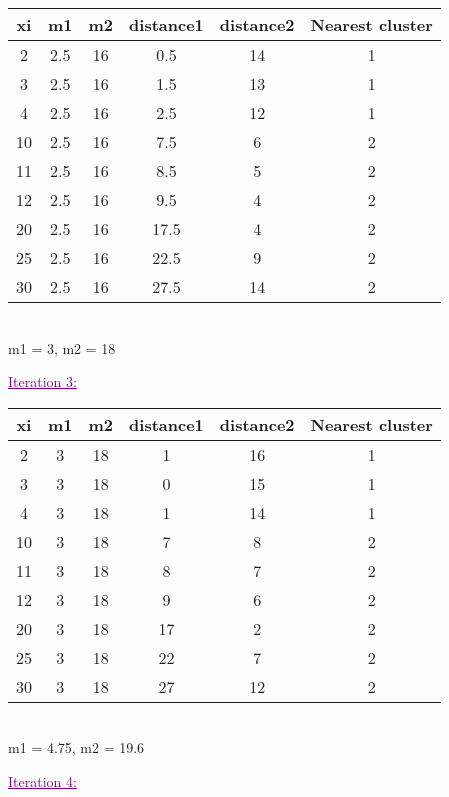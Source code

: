 \begin{tabular} {|c|c|c|c|c|c|}
    \hline
        xi & m1 & m2 & distance1 & distance2 & Nearest cluster \\
        \hline
        \hline
        2 & 2.5 & 16 & 0.5 & 14 & 1\\
        \hline
        3 & 2.5 & 16 & 1.5 & 13 & 1\\
        \hline
        4 & 2.5 & 16 & 2.5 & 12 & 1\\
        \hline
        10 & 2.5 & 16 & 7.5 & 6 & 2\\
        \hline
        11 & 2.5 & 16 & 8.5 & 5 & 2\\
        \hline
        12 & 2.5 & 16 & 9.5 & 4 & 2\\
        \hline
        20 & 2.5 & 16 & 17.5 & 4 & 2\\
        \hline
        25 & 2.5 & 16 & 22.5 & 9 & 2\\
        \hline
        30 & 2.5 & 16 & 27.5 & 14 & 2\\
        \hline 
    \end{tabular}
\\ [5pt]
m1 = 3, m2 = 18

\textcolor{purple}{\underline{Iteration 3:}} \\

\begin{tabular} {|c|c|c|c|c|c|}
    \hline
        xi & m1 & m2 & distance1 & distance2 & Nearest cluster \\
        \hline
        \hline
        2 & 3 & 18 & 1 & 16 & 1\\
        \hline
        3 & 3 & 18 & 0 & 15 & 1\\
        \hline
        4 & 3 & 18 & 1 & 14 & 1\\
        \hline
        10 & 3 & 18 & 7 & 8 & 2\\
        \hline
        11 & 3 & 18 & 8 & 7 & 2\\
        \hline
        12 & 3 & 18 & 9 & 6 & 2\\
        \hline
        20 & 3 & 18 & 17 & 2 & 2\\
        \hline
        25 & 3 & 18 & 22 & 7 & 2\\
        \hline
        30 & 3 & 18 & 27 & 12 & 2\\
        \hline 
    \end{tabular}
\\ [5pt]
m1 = 4.75, m2 = 19.6

\textcolor{purple}{\underline{Iteration 4:}} \\

